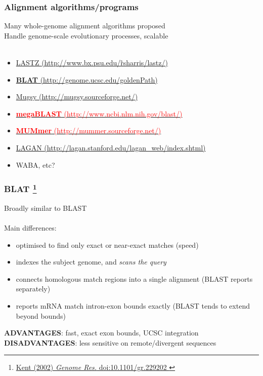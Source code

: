 %
\begin{frame}
  \frametitle{Alignment algorithms/programs}
  \textcolor{hutton_green}{Many whole-genome alignment algorithms proposed} \\
  Handle genome-scale evolutionary processes, scalable \\~\\
  \begin{itemize}
    \item \href{http://www.bx.psu.edu/~rsharris/lastz/}{LASTZ (http://www.bx.psu.edu/\~rsharris/lastz/)}
    \item \href{http://genome.ucsc.edu/goldenPath/help/blatSpec.html}{\textcolor{hutton_blue}{\textbf{BLAT} (http://genome.ucsc.edu/goldenPath)}}
    \item \href{http://mugsy.sourceforge.net/}{Mugsy (http://mugsy.sourceforge.net/)}
    \item \href{http://www.ncbi.nlm.nih.gov/blast/html/megablast.html}{\textcolor{red}{\textbf{megaBLAST} (http://www.ncbi.nlm.nih.gov/blast/)}}
    \item \href{http://mummer.sourceforge.net/}{\textcolor{red}{\textbf{MUMmer} (http://mummer.sourceforge.net/)}}
    \item \href{http://lagan.stanford.edu/lagan_web/index.shtml}{LAGAN (http://lagan.stanford.edu/lagan\_web/index.shtml)}
    \item WABA, etc?
  \end{itemize}
\end{frame}

%
\begin{frame}
  \frametitle{BLAT
  \footnote{\tiny{\href{http://dx.doi.org/10.1101/gr.229202
}{Kent (2002) \textit{Genome Res.} doi:10.1101/gr.229202
}}}
  }
  Broadly similar to BLAST \\~\\
  \textcolor{hutton_blue}{Main differences:}
  \begin{itemize}
    \item optimised to find \textcolor{hutton_purple}{only exact or near-exact matches} (speed)
    \item indexes the subject genome, and \textcolor{hutton_purple}{\textit{scans the query}}
    \item connects homologous match regions into a single alignment (BLAST reports separately)
    \item reports mRNA match intron-exon bounds exactly (BLAST tends to extend beyond bounds)
  \end{itemize}
  \textcolor{hutton_green}{\textbf{ADVANTAGES}: fast, exact exon bounds, UCSC integration}
  \textcolor{RawSienna}{\textbf{DISADVANTAGES}: less sensitive on remote/divergent sequences}
\end{frame}